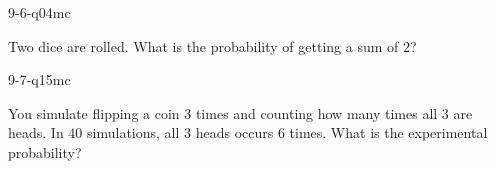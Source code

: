 \begin{practiceQuestion}{9-6-q04}{mc}
\begin{questionText}
Two dice are rolled. What is the probability of getting a sum of $2$?
\end{questionText}
\end{practiceQuestion}

\begin{practiceQuestion}{9-7-q15}{mc}
\begin{questionText}
You simulate flipping a coin $3$ times and counting how many times all $3$ are heads. In $40$ simulations, all $3$ heads occurs $6$ times. What is the experimental probability?
\end{questionText}
\end{practiceQuestion}
